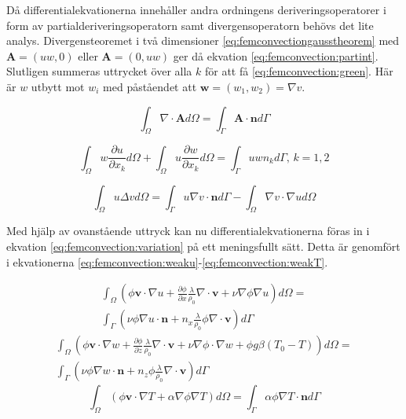 \noindent
Då differentialekvationerna innehåller andra ordningens deriveringsoperatorer i form av
partialderiveringsoperatorn samt divergensoperatorn behövs det lite analys.
Divergensteoremet i två dimensioner \eqref{eq:femconvectiongausstheorem}
med $\mathbf{A} = (uw, 0)$ eller $\mathbf{A} = (0, uw)$ ger då ekvation
\eqref{eq:femconvection:partint}. Slutligen summeras uttrycket över alla
$k$ för att få \eqref{eq:femconvection:green}. Här är $w$ utbytt mot $w_i$ med
påståendet att $\mathbf{w} = (w_1, w_2) = \nabla v$. \cite{johnson2009}

\begin{equation}
\label{eq:femconvectiongausstheorem}
\int_\Omega \nabla\cdot \mathbf{A} d\Omega = \int_\Gamma \mathbf{A}\cdot\mathbf{n} d\Gamma
\end{equation} 

\begin{equation}
\label{eq:femconvection:partint}
\int_\Omega w\frac{\partial u}{\partial x_k} d\Omega +
\int_\Omega u\frac{\partial w}{\partial x_k} d\Omega =
\int_\Gamma uwn_k d\Gamma\mbox{,   }k=1,2
\end{equation}

\begin{equation}
\label{eq:femconvection:green}
\int_\Omega u\Delta v d\Omega =
\int_\Gamma u\nabla v\cdot\mathbf{n}d\Gamma-\int_\Omega \nabla v\cdot\nabla u d\Omega
\end{equation}

\noindent
Med hjälp av ovanstående uttryck kan nu differentialekvationerna föras in i
ekvation \eqref{eq:femconvection:variation} på ett meningsfullt sätt. Detta är genomfört i 
ekvationerna \eqref{eq:femconvection:weaku}-\eqref{eq:femconvection:weakT}.

\begin{align}
\int_\Omega \left(\phi\mathbf{v}\cdot\nabla u +
\frac{\partial \phi}{\partial x}\frac{\lambda}{\rho_0}\nabla\cdot\mathbf{v}
+\nu\nabla\phi\nabla u\right)d\Omega = \nonumber \\
\int_\Gamma\left( \nu\phi\nabla u\cdot\mathbf{n} +
n_x\frac{\lambda}{\rho_0}\phi\nabla\cdot\mathbf{v}\right)d\Gamma
\label{eq:femconvection:weaku}
\end{align}
\begin{align}
\int_\Omega\left(\phi\mathbf{v}\cdot\nabla w
+ \frac{\partial \phi}{\partial z} \frac{\lambda}{\rho_0}\nabla\cdot\mathbf{v}
+ \nu\nabla\phi\cdot\nabla w + \phi g\beta(T_0-T)\right)d\Omega
= \nonumber \\
\int_\Gamma\left(\nu\phi\nabla w\cdot\mathbf{n} +
n_z\phi\frac{\lambda}{\rho_0}\nabla\cdot\mathbf{v}\right)d\Gamma
\label{eq:femconvection:weakw}
\end{align}
\begin{equation}
\int_\Omega\left(\phi\mathbf{v}\cdot\nabla T + \alpha\nabla\phi\nabla T\right)d\Omega
= \int_\Gamma \alpha\phi\nabla T\cdot\mathbf{n}d\Gamma
\label{eq:femconvection:weakT}
\end{equation}



